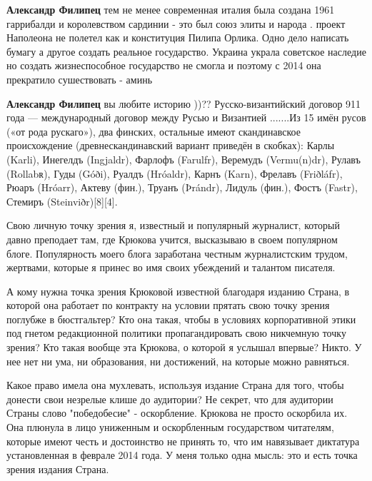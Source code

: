 \begin{itemize}
\begin{itemize}
\textbf{Александр Филипец} тем не менее современная италия была создана 1961
гаррибалди и королевством сардинии - это был союз элиты и народа . проект
Наполеона не полетел как и конституция Пилипа Орлика. Одно дело написать бумагу
а другое создать реальное государство. Украина украла советское наследие но
создать жизнеспособное государство не смогла и поэтому с 2014 она прекратило
сушествовать - аминь

 
\textbf{Александр Филипец} вы любите историю ))?? Русско-византийский договор 911 года — международный договор между Русью и Византией .......Из 15 имён русов («от рода рускаго»), два финских, остальные имеют скандинавское происхождение (древнескандинавский вариант приведён в скобках): Карлы (Karli), Инегелдъ (Ingjaldr), Фарлофъ (Farulfr), Веремудъ (Vermu(n)dr), Рулавъ (Rollabʀ), Гуды (Góði), Руалдъ (Hróaldr), Карнъ (Karn), Фрелавъ (Friðláfr), Рюаръ (Hróarr), Актеву (фин.), Труанъ (Þrándr), Лидуль (фин.), Фостъ (Fastr), Стемиръ (Steinviðr)[8][4].

\end{itemize}

 

Свою личную точку зрения я, известный и популярный журналист, который давно
преподает там, где Крюкова учится, высказываю в своем популярном блоге.
Популярность моего блога заработана честным журналистским трудом, жертвами,
которые я принес во имя своих убеждений и талантом писателя. 

А кому нужна точка зрения Крюковой известной благодаря изданию Страна, в
которой она работает по контракту на условии прятать свою точку зрения поглубже
в бюстгальтер? Кто она такая, чтобы в условиях корпоративной этики под гнетом
редакционной политики пропагандировать свою никчемную точку зрения? Кто такая
вообще эта Крюкова, о которой я услышал впервые? Никто. У нее нет ни ума, ни
образования, ни достижений, на которые можно равняться. 

Какое право имела она мухлевать, используя издание Страна для того, чтобы
донести свои незрелые клише до аудитории? Не секрет, что для аудитории Страны
слово "победобесие" - оскорбление. Крюкова не просто оскорбила их. Она плюнула
в лицо униженным и оскорбленным государством читателям, которые имеют честь и
достоинство не принять то, что им навязывает диктатура установленная в феврале
2014 года. У меня только одна мысль: это и есть точка зрения издания Страна.


\end{itemize}
